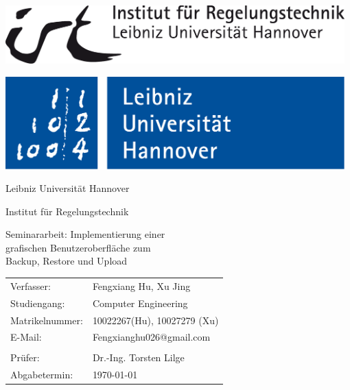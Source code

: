 \selectfont  %

\thispagestyle{empty}
\vspace*{-2cm}
\begin{minipage}{0.4\textwidth}
\includegraphics[width=0.98\textwidth]{styles/irt_black}
\end{minipage}
\hfill
\begin{minipage}{0.3\textwidth}
\includegraphics[width=0.98\textwidth]{styles/luh_brieflogo_blau}
\end{minipage}

\vspace{2cm}     
\begin{center}

   {\large Leibniz Universit\"at Hannover}
   
   {\Large Institut f\"ur Regelungstechnik}
   

   \vspace{2cm}
   {\LARGE Seminararbeit: Implementierung einer\\[0.4ex]
   	grafischen Benutzeroberfläche zum \\ [1ex]
   	Backup, Restore und Upload}
   
   
	\vspace{6cm}
	\large
	\begin{tabular}{ll}
		\hline
		Verfasser:      & Fengxiang Hu, Xu Jing        \\
		Studiengang:    & Computer Engineering        \\
		Matrikelnummer: & 10022267(Hu), 10027279 (Xu) \\
		E-Mail:         & Fengxianghu026@gmail.com    \\ \hline \\
		Prüfer:         & Dr.-Ing. Torsten Lilge      \\
		Abgabetermin:   & \today                       \\ 
	\end{tabular}

\end{center}


